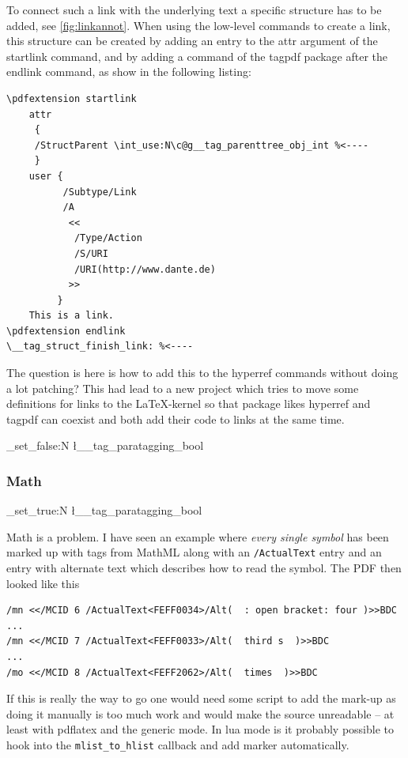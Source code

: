 \documentclass[DIV=12,parskip=half-,bibliography=totoc]{scrartcl}
\newcommand\PDF{PDF}
\newcommand\parataggingON {\bool_set_true:N \l__tag_paratagging_bool}
\newcommand\parataggingOff{\bool_set_false:N \l__tag_paratagging_bool}
\begin{document}
To connect such a link with the underlying text a specific structure has to be added, see \ref{fig:linkannot}. When using the low-level commands to create a link, this structure can be created by adding an entry to the attr argument of the startlink command, and by adding a command of the tagpdf package after the endlink command, as show in the following listing:


\begin{lstlisting}
\pdfextension startlink
    attr
     {
     /StructParent \int_use:N\c@g__tag_parenttree_obj_int %<----
     }
    user {
          /Subtype/Link
          /A
           <<
            /Type/Action
            /S/URI
            /URI(http://www.dante.de)
           >>
         }
    This is a link.
\pdfextension endlink
\__tag_struct_finish_link: %<----
\end{lstlisting}


The question is here is how to add this to the hyperref commands without doing a lot patching? This had lead to a new project which tries to move some definitions for links to the \LaTeX-kernel so that package likes hyperref and tagpdf can coexist and both add their code to links at the same time.

\parataggingOff

\subsubsection{Math}

\parataggingON

Math is a problem. I have seen an example where \emph{every single symbol} has been marked up with tags from MathML along with an \texttt{/ActualText} entry and an entry with alternate text which describes how to read the symbol.
The \PDF{} then looked like this


\begin{lstlisting}
/mn <</MCID 6 /ActualText<FEFF0034>/Alt(  : open bracket: four )>>BDC
...
/mn <</MCID 7 /ActualText<FEFF0033>/Alt(  third s  )>>BDC
...
/mo <</MCID 8 /ActualText<FEFF2062>/Alt(  times  )>>BDC
\end{lstlisting}



If this is really the way to go one would need some script to add the mark-up as doing it manually is too much work and would make the source unreadable -- at least with pdflatex and the generic mode. In lua mode is it probably possible to hook into the \texttt{mlist\_to\_hlist} callback and add marker automatically.
\end{document}
